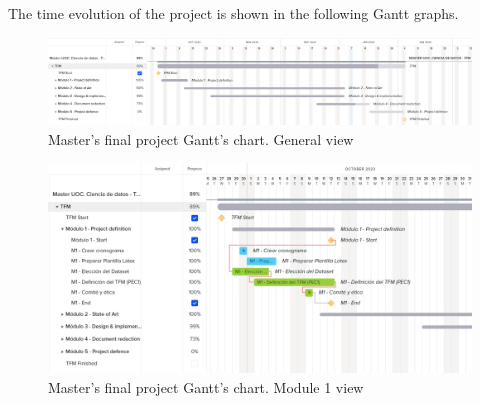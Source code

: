 \begin{table}[H]
    \caption{Project Timetable.}
    \label{table:Timetable}
\end{table}



The time evolution of the project is shown in the following Gantt graphs.

\begin{figure}[H]
    \begin{center}
        \includegraphics[scale=0.30]{images/Introduccion/Planning/TFM_General_Planing.png}
        \caption{Master's final project Gantt's chart. General view}
    \label{fig:Gantt}    
    \end{center}
\end{figure}


\begin{figure}[H]
    \begin{center}
        \includegraphics[scale=0.50]{images/Introduccion/Planning/TFM_M1_Planing.png}
        \caption{Master's final project Gantt's chart. Module 1 view}
    \label{fig:Gantt_M1}    
    \end{center}
\end{figure}

